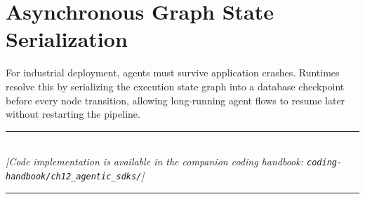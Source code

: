 \section{Asynchronous Graph State Serialization}

For industrial deployment, agents must survive application crashes. Runtimes resolve this by serializing the execution state graph into a database checkpoint before every node transition, allowing long-running agent flows to resume later without restarting the pipeline.

\begin{center}
\noindent\rule{0.6\textwidth}{0.4pt} \\
\vspace{0.3em}
\textit{[Code implementation is available in the companion coding handbook: \texttt{coding-handbook/ch12\_agentic\_sdks/}]} \\
\noindent\rule{0.6\textwidth}{0.4pt}
\end{center}
